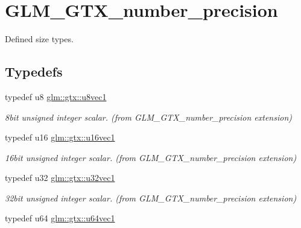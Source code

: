 \hypertarget{group__gtx__number__precision}{}\section{G\+L\+M\+\_\+\+G\+T\+X\+\_\+number\+\_\+precision}
\label{group__gtx__number__precision}


Defined size types.  


\subsection*{Typedefs}
\begin{DoxyCompactItemize}
\item 
typedef u8 \hyperlink{group__gtx__number__precision_ga35ae7849593a354420e4f52d1b36c2d6}{glm\+::gtx\+::u8vec1}\hypertarget{group__gtx__number__precision_ga35ae7849593a354420e4f52d1b36c2d6}{}\label{group__gtx__number__precision_ga35ae7849593a354420e4f52d1b36c2d6}

\begin{DoxyCompactList}\small\item\em 8bit unsigned integer scalar. (from G\+L\+M\+\_\+\+G\+T\+X\+\_\+number\+\_\+precision extension) \end{DoxyCompactList}\item 
typedef u16 \hyperlink{group__gtx__number__precision_ga807d7e5f24e981b1575bd40ca159781d}{glm\+::gtx\+::u16vec1}\hypertarget{group__gtx__number__precision_ga807d7e5f24e981b1575bd40ca159781d}{}\label{group__gtx__number__precision_ga807d7e5f24e981b1575bd40ca159781d}

\begin{DoxyCompactList}\small\item\em 16bit unsigned integer scalar. (from G\+L\+M\+\_\+\+G\+T\+X\+\_\+number\+\_\+precision extension) \end{DoxyCompactList}\item 
typedef u32 \hyperlink{group__gtx__number__precision_gac46a7890b20928df83e734c3ea9557d4}{glm\+::gtx\+::u32vec1}\hypertarget{group__gtx__number__precision_gac46a7890b20928df83e734c3ea9557d4}{}\label{group__gtx__number__precision_gac46a7890b20928df83e734c3ea9557d4}

\begin{DoxyCompactList}\small\item\em 32bit unsigned integer scalar. (from G\+L\+M\+\_\+\+G\+T\+X\+\_\+number\+\_\+precision extension) \end{DoxyCompactList}\item 
typedef u64 \hyperlink{group__gtx__number__precision_ga92812a1d7e746bcaba61d2f5a64afc52}{glm\+::gtx\+::u64vec1}\hypertarget{group__gtx__number__precision_ga92812a1d7e746bcaba61d2f5a64afc52}{}\label{group__gtx__number__precision_ga92812a1d7e746bcaba61d2f5a64afc52}


\end{DoxyCompactItemize}
